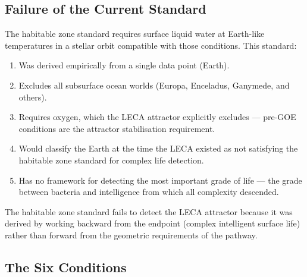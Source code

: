 \documentclass[11pt, a4paper]{article}
\begin{document}
\subsection{Failure of the Current Standard}

The habitable zone standard requires surface liquid water
at Earth-like temperatures in a stellar orbit compatible
with those conditions. This standard:

\begin{enumerate}[leftmargin=*, label=(\alph*)]
\item Was derived empirically from a single data point (Earth).
\item Excludes all subsurface ocean worlds (Europa,
  Enceladus, Ganymede, and others).
\item Requires oxygen, which the LECA attractor explicitly
  excludes --- pre-GOE conditions are the attractor
  stabilisation requirement.
\item Would classify the Earth at the time the LECA
  existed as not satisfying the habitable zone standard
  for complex life detection.
\item Has no framework for detecting the most important
  grade of life --- the grade between bacteria and
  intelligence from which all complexity descended.
\end{enumerate}

The habitable zone standard fails to detect the LECA
attractor because it was derived by working backward
from the endpoint (complex intelligent surface life)
rather than forward from the geometric requirements
of the pathway.

\subsection{The Six Conditions}
\end{document}
